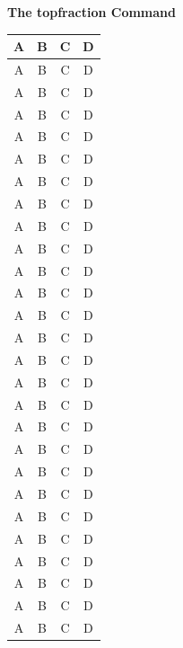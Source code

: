 \documentclass{article}
\begin{document}
	{\centering\Huge\bf The topfraction Command}
	
	\begin{table}[t]
		\begin{tabular}{|*{4}{c|}}
			\hline A & B & C & D \\ \hline
			\hline A & B & C & D \\ \hline
			\hline A & B & C & D \\ \hline
			\hline A & B & C & D \\ \hline
			\hline A & B & C & D \\ \hline
			\hline A & B & C & D \\ \hline
			\hline A & B & C & D \\ \hline
			\hline A & B & C & D \\ \hline
			\hline A & B & C & D \\ \hline
			\hline A & B & C & D \\ \hline
			\hline A & B & C & D \\ \hline
			\hline A & B & C & D \\ \hline
			\hline A & B & C & D \\ \hline
			\hline A & B & C & D \\ \hline
			\hline A & B & C & D \\ \hline
			\hline A & B & C & D \\ \hline
			\hline A & B & C & D \\ \hline
			\hline A & B & C & D \\ \hline
			\hline A & B & C & D \\ \hline
			\hline A & B & C & D \\ \hline
			\hline A & B & C & D \\ \hline
			\hline A & B & C & D \\ \hline
			\hline A & B & C & D \\ \hline
			\hline A & B & C & D \\ \hline
			\hline A & B & C & D \\ \hline
			\hline A & B & C & D \\ \hline
			\hline A & B & C & D \\ \hline
		\end{tabular}
	\end{table}
	
\end{document}
